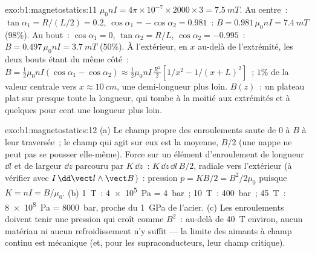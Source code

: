 \begin{solution}{exo:b1:magnetostatics:11}
$\mu_0nI = 4\pi \times 10^{-7} \times 2000 \times 3 = \qty{7.5}{mT}$. Au centre~: $\tan\alpha_1 =
R/(L/2) = 0.2$, $\cos\alpha_1 = -\cos\alpha_2 = 0.981$~: $B = 0.981\,\mu_0nI =
\qty{7.4}{mT}$ ($98\%$). Au bout~: $\cos\alpha_1 = 0$, $\tan\alpha_2 = R/L$, $\cos\alpha_2 =
-0.995$~: $B = 0.497\,\mu_0nI = \qty{3.7}{mT}$ ($50\%$). À l'extérieur, en $x$ au-delà de
l'extrémité, les deux bouts étant du même côté~: $B = \tfrac12\mu_0nI(\cos\alpha_1 - \cos\alpha_2)
\approx \tfrac12\mu_0nI\,\tfrac{R^2}{2}[1/x^2 - 1/(x + L)^2]$~; $1\%$ de la valeur
centrale vers $x \approx \qty{10}{cm}$, une demi-longueur plus loin. $B(z)$~: un plateau
plat sur presque toute la longueur, qui tombe à la moitié aux extrémités et à
quelques pour cent une longueur plus loin.
\end{solution}

\begin{solution}{exo:b1:magnetostatics:12}
(a) Le champ propre des enroulements saute de $0$ à $B$ à leur traversée~; le
champ qui agit sur eux est la moyenne, $B/2$ (une nappe ne peut pas se pousser
elle-même). Force sur un élément d'enroulement de longueur $\dd l$ et de largeur $\dd z$
parcouru par $K\,\dd z$~: $K\,\dd z\,\dd l\,B/2$, radiale vers l'extérieur (à vérifier avec $I\,\dd\vect l
\wedge\vect B$)~: pression $p = KB/2 = B^2/2\mu_0$ puisque $K = nI = B/\mu_0$.
(b) \qty{1}{T}~: \qty{4e5}{Pa} = \qty{4}{bar}~; \qty{10}{T}~: \qty{400}{bar}~; \qty{45}{T}~:
\qty{8e8}{Pa} = \qty{8000}{bar}, proche du \qty{1}{GPa} de l'acier. (c) Les
enroulements doivent tenir une pression qui croît comme $B^2$~: au-delà de
\qty{40}{T} environ, aucun matériau ni aucun refroidissement n'y suffit --- la
limite des aimants à champ continu est mécanique (et, pour les
supraconducteurs, leur champ critique).
\end{solution}

